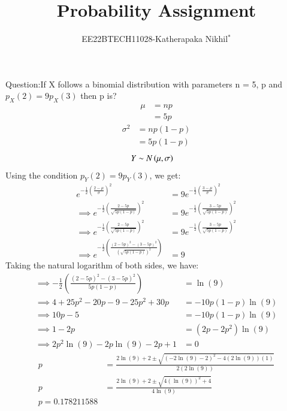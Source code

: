 \documentclass[journal,12pt,twocolumn]{IEEEtran}
\theoremstyle{remark}
\begin{document}

\vspace{3cm}

\title{Probability Assignment}
\author{EE22BTECH11028-Katherapaka Nikhil$^{*}$%
}
\maketitle
\newpage
\bigskip
\renewcommand{\thefigure}{\theenumi}
\renewcommand{\thetable}{\theenumi}

Question:If X follows a binomial distribution with parameters n = 5, p and
$p_X(2) = 9p_X(3)$
then p is?\\
\solution
\fi
\begin{align}
\mu&=np\\
&=5p
\end{align}
\begin{align}
\sigma^2&=np(1-p)\\
&=5p(1-p)
\end{align}
\begin{align}
	Y &\sim N\left(\mu,\sigma\right)
\end{align}
Using the condition \(p_Y(2) = 9p_Y(3)\), we get:
\begin{align}
e^{-\frac{1}{2}(\frac{2-\mu}{\sigma})^2} &= 9 e^{-\frac{1}{2}\left(\frac{3-\mu}{\sigma}\right)^2} \\
\implies e^{-\frac{1}{2}\left(\frac{2 -  5p}{\sqrt{5p(1-p)}}\right)^2} &= 9 e^{-\frac{1}{2}\left(\frac{3 - 5p}{\sqrt{5p(1-p)}}\right)^2} \\
\implies e^{-\frac{1}{2}\left(\frac{2 - 5p}{\sqrt{5p(1-p)}}\right)^2} &= 9 e^{-\frac{1}{2}\left(\frac{3 - 5p}{\sqrt{5p(1-p)}}\right)^2} \\
\implies e^{-\frac{1}{2}\left(\frac{(2 - 5p)^2-(3 - 5p)^2}{(\sqrt{5p(1-p)})^2}\right)}&=9
\end{align}
Taking the natural logarithm of both sides, we have:
\begin{align}
\implies -\frac{1}{2}\left(\frac{(2 - 5p)^2-(3 - 5p)^2}{5p(1-p)}\right) &= \ln(9) \\
\implies 4+25p^2-20p-9-25p^2+30p &= -10p(1-p) \ln(9) \\
\implies 10p-5 &= -10p(1-p) \ln(9) \\
\implies 1-2p &= (2p-2p^2) \ln(9) \\
\implies 2p^2\ln(9) - 2p\ln(9) - 2p + 1 &= 0 
\end{align}
\begin{align}
p &= \frac{2\ln(9) + 2 \pm \sqrt{(-2\ln(9) - 2)^2 - 4(2\ln(9))(1)}}{2(2\ln(9))} \\
p &= \frac{2\ln(9) + 2 \pm \sqrt{4(\ln(9))^2 +4}}{4\ln(9)}\\
p=0.178211588
\end{align}
\end{document}
